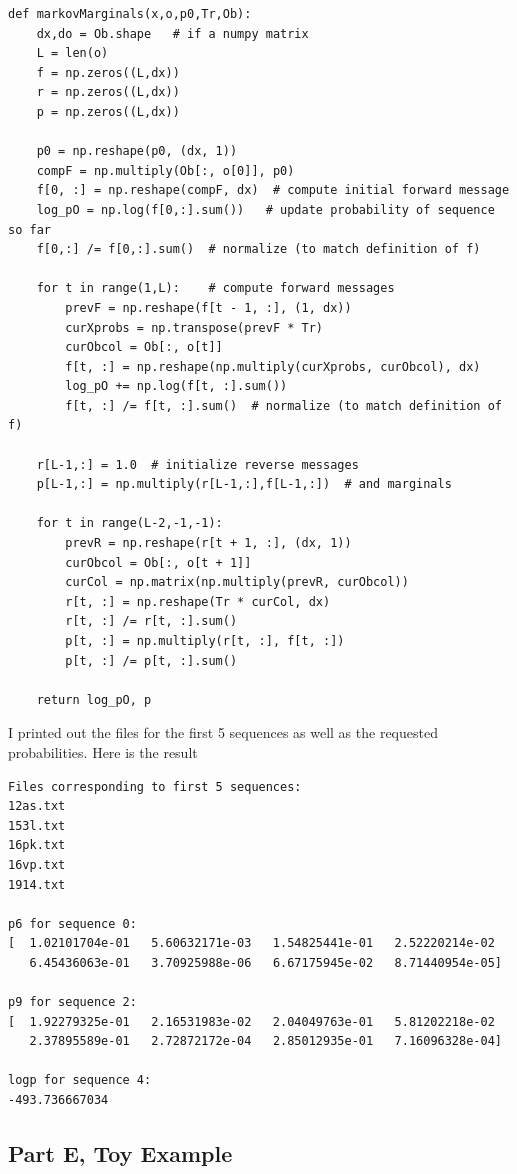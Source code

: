 \documentclass[twoside,11pt]{article}
\theoremstyle{definition}
\begin{document}
\begin{lstlisting}
def markovMarginals(x,o,p0,Tr,Ob):
    dx,do = Ob.shape   # if a numpy matrix
    L = len(o)
    f = np.zeros((L,dx))
    r = np.zeros((L,dx))
    p = np.zeros((L,dx))

    p0 = np.reshape(p0, (dx, 1))
    compF = np.multiply(Ob[:, o[0]], p0)
    f[0, :] = np.reshape(compF, dx)  # compute initial forward message
    log_pO = np.log(f[0,:].sum())   # update probability of sequence so far
    f[0,:] /= f[0,:].sum()  # normalize (to match definition of f)

    for t in range(1,L):    # compute forward messages
        prevF = np.reshape(f[t - 1, :], (1, dx))
        curXprobs = np.transpose(prevF * Tr)
        curObcol = Ob[:, o[t]]
        f[t, :] = np.reshape(np.multiply(curXprobs, curObcol), dx)
        log_pO += np.log(f[t, :].sum())
        f[t, :] /= f[t, :].sum()  # normalize (to match definition of f)

    r[L-1,:] = 1.0  # initialize reverse messages
    p[L-1,:] = np.multiply(r[L-1,:],f[L-1,:])  # and marginals

    for t in range(L-2,-1,-1):
        prevR = np.reshape(r[t + 1, :], (dx, 1))
        curObcol = Ob[:, o[t + 1]]
        curCol = np.matrix(np.multiply(prevR, curObcol))
        r[t, :] = np.reshape(Tr * curCol, dx)
        r[t, :] /= r[t, :].sum()
        p[t, :] = np.multiply(r[t, :], f[t, :])
        p[t, :] /= p[t, :].sum()

    return log_pO, p
\end{lstlisting}
\newpage
I printed out the files for the first 5 sequences as well as the requested probabilities. Here is the result

\begin{lstlisting}
Files corresponding to first 5 sequences:
12as.txt
153l.txt
16pk.txt
16vp.txt
1914.txt

p6 for sequence 0:
[  1.02101704e-01   5.60632171e-03   1.54825441e-01   2.52220214e-02
   6.45436063e-01   3.70925988e-06   6.67175945e-02   8.71440954e-05]

p9 for sequence 2:
[  1.92279325e-01   2.16531983e-02   2.04049763e-01   5.81202218e-02
   2.37895589e-01   2.72872172e-04   2.85012935e-01   7.16096328e-04]

logp for sequence 4:
-493.736667034
\end{lstlisting}

\subsection*{Part E, Toy Example}
\end{document}
